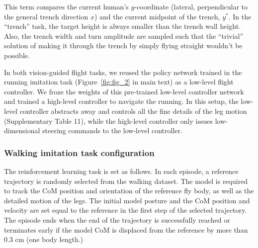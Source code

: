 \documentclass[sn-mathphys-num]{sn-jnl}%
\theoremstyle{thmstyleone}%
\theoremstyle{thmstyletwo}%
\theoremstyle{thmstylethree}%
\begin{document}
\begin{appendices}
This term compares the current human's $ y $-coordinate (lateral, perpendicular to the general trench direction $ x $) and the current midpoint of the trench, $ y^{*} $.
In the “trench” task, the target height is always smaller than the trench wall height. 
Also, the trench width and turn amplitude are sampled such that the “trivial” solution of making it through the trench by simply flying straight wouldn’t be possible.


In both vision-guided flight tasks, we reused the policy network trained in the running imitation task (Figure~\ref{fig:fig_2} in main text) as a low-level flight controller. 
We froze the weights of this pre-trained low-level controller network and trained a high-level controller to navigate the running. 
In this setup, the low-level controller abstracts away and controls all the fine details of the leg motion (Supplementary Table 11), while the high-level controller only issues low-dimensional steering commands to the low-level controller.



\subsubsection{Walking imitation task configuration}

The reinforcement learning task is set as follows. 
In each episode, a reference trajectory is randomly selected from the walking dataset. 
The model is required to track the CoM position and orientation of the reference fly body, as well as the detailed motion of the legs. 
The initial model posture and the CoM position and velocity are set equal to the reference in the first step of the selected trajectory. 
The episode ends when the end of the trajectory is successfully reached or terminates early if the model CoM is displaced from the reference by more than 0.3 cm (one body length.)



\end{appendices}
\end{document}
